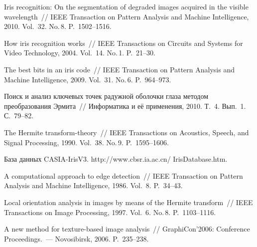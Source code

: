 \begin{multicols}{2}
{\small\frenchspacing
{%
\begin{thebibliography}{9}

Iris recognition: On the segmentation of degraded images acquired in the visible 
wavelength~// IEEE Transaction on Pattern Analysis and Machine Intelligence, 
2010. Vol.~32. No.\,8. P.~1502--1516.

 How iris recognition works~// IEEE Transactions on Circuits and 
Systems for Video Technology, 2004. Vol.~14. No.\,1. P.~21--30. 

The best bits in an iris code~// IEEE Transaction on Pattern Analysis and Machine 
Intelligence, 2009. Vol.~31. No.\,6. P.~964--973. 

Поиск и анализ ключевых точек радужной оболочки глаза методом 
преобразования Эрмита~// Информатика и её применения, 2010. Т.~4. Вып.~1. 
С.~79--82.

The Hermite transform-theory~// IEEE Transactions on Acoustics, Speech, and Signal 
Processing, 1990. Vol.~38. No.\,9. P.~1595--1606.

База данных CASIA-IrisV3. {\sf http://www.cbsr.ia.ac.cn/ IrisDatabase.htm.}

A computational approach to edge detection~// IEEE Transaction on Pattern Analysis 
and Machine Intelligence, 1986. Vol.~8. P.~34--43.

Local orientation analysis in images by means of the Hermite transform~// IEEE 
Transactions on Image Processing, 1997. Vol.~6. No.\,8. P.~1103--1116.


 \label{end\stat}
 
A new method for texture-based image analysis~// GraphiCon'2006: Conference 
Proceedings.~--- Novosibirsk, 2006. P.~235--238.
 \end{thebibliography}
}
}


\end{multicols}  

 
 
 
 